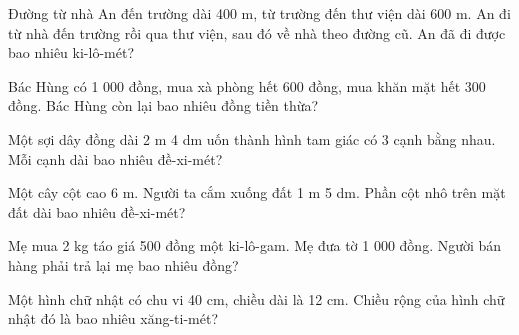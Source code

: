 \begin{ex} %
Đường từ nhà An đến trường dài 400 m, từ trường đến thư viện dài 600 m. An đi từ nhà đến trường rồi qua thư viện, sau đó về nhà theo đường cũ. An đã đi được bao nhiêu ki-lô-mét?
\end{ex}

\begin{ex} %
Bác Hùng có 1 000 đồng, mua xà phòng hết 600 đồng, mua khăn mặt hết 300 đồng. Bác Hùng còn lại bao nhiêu đồng tiền thừa?
\end{ex}

\begin{ex} %
Một sợi dây đồng dài 2 m 4 dm uốn thành hình tam giác có 3 cạnh bằng nhau. Mỗi cạnh dài bao nhiêu đề-xi-mét?
\end{ex}

\begin{ex} %
Một cây cột cao 6 m. Người ta cắm xuống đất 1 m 5 dm. Phần cột nhô trên mặt đất dài bao nhiêu đề-xi-mét?
\end{ex}

\begin{ex} %
Mẹ mua 2 kg táo giá 500 đồng một ki-lô-gam. Mẹ đưa tờ 1 000 đồng. Người bán hàng phải trả lại mẹ bao nhiêu đồng?
\end{ex}

\begin{ex} %
Một hình chữ nhật có chu vi 40 cm, chiều dài là 12 cm. Chiều rộng của hình chữ nhật đó là bao nhiêu xăng-ti-mét?
\end{ex}
